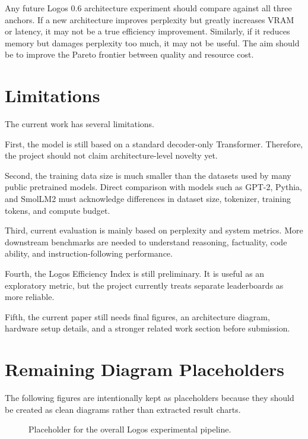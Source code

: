 \documentclass[conference]{IEEEtran}
\begin{document}
Any future Logos 0.6 architecture experiment should compare against all three anchors. If a new architecture improves perplexity but greatly increases VRAM or latency, it may not be a true efficiency improvement. Similarly, if it reduces memory but damages perplexity too much, it may not be useful. The aim should be to improve the Pareto frontier between quality and resource cost.

\section{Limitations}

The current work has several limitations.

First, the model is still based on a standard decoder-only Transformer. Therefore, the project should not claim architecture-level novelty yet.

Second, the training data size is much smaller than the datasets used by many public pretrained models. Direct comparison with models such as GPT-2, Pythia, and SmolLM2 must acknowledge differences in dataset size, tokenizer, training tokens, and compute budget.

Third, current evaluation is mainly based on perplexity and system metrics. More downstream benchmarks are needed to understand reasoning, factuality, code ability, and instruction-following performance.

Fourth, the Logos Efficiency Index is still preliminary. It is useful as an exploratory metric, but the project currently treats separate leaderboards as more reliable.

Fifth, the current paper still needs final figures, an architecture diagram, hardware setup details, and a stronger related work section before submission.


\section{Remaining Diagram Placeholders}

The following figures are intentionally kept as placeholders because they should be created as clean diagrams rather than extracted result charts.

\begin{figure}[H]
    \centering
    \caption{Placeholder for the overall Logos experimental pipeline.}
    \label{fig:placeholder_pipeline}
\end{figure}
\end{document}
